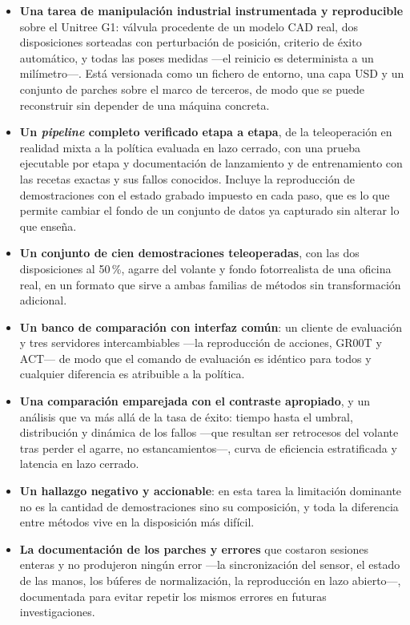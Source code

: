 \begin{itemize}

	\item \textbf{Una tarea de manipulación industrial instrumentada y reproducible} sobre el
	Unitree G1: válvula procedente de un modelo CAD real, dos disposiciones sorteadas con
	perturbación de posición, criterio de éxito automático, y todas las poses medidas —el reinicio
	es determinista a un milímetro—. Está versionada como un fichero de entorno, una capa USD y
	un conjunto de parches sobre el marco de terceros, de modo que se puede reconstruir sin
	depender de una máquina concreta.

	\item \textbf{Un \textit{pipeline} completo verificado etapa a etapa}, de la
	teleoperación en realidad mixta a la política evaluada en lazo cerrado, con una prueba
	ejecutable por etapa y documentación de lanzamiento y de entrenamiento con las recetas
	exactas y sus fallos conocidos. Incluye la reproducción de demostraciones con el estado grabado
	impuesto en cada paso, que es lo que permite cambiar el fondo de un conjunto de datos ya
	capturado sin alterar lo que enseña.

	\item \textbf{Un conjunto de cien demostraciones teleoperadas}, con las dos disposiciones al
	50\,\%, agarre del volante y fondo fotorrealista de una oficina real, en un formato que sirve a
	ambas familias de métodos sin transformación adicional.

	\item \textbf{Un banco de comparación con interfaz común}: un cliente de evaluación y tres
	servidores intercambiables —la reproducción de acciones, GR00T y ACT— de modo que el comando de
	evaluación es idéntico para todos y cualquier diferencia es atribuible a la política.

	\item \textbf{Una comparación emparejada con el contraste apropiado}, y un análisis que va más
	allá de la tasa de éxito: tiempo hasta el umbral, distribución y dinámica de los fallos —que
	resultan ser retrocesos del volante tras perder el agarre, no estancamientos—, curva de
	eficiencia estratificada y latencia en lazo cerrado.

	\item \textbf{Un hallazgo negativo y accionable}: en esta tarea la limitación dominante no es
	la cantidad de demostraciones sino su composición, y toda la diferencia entre métodos vive en
	la disposición más difícil.

	\item \textbf{La documentación de los parches y errores} que costaron sesiones enteras y no produjeron
	ningún error —la sincronización del sensor, el estado de las manos, los búferes de
	normalización, la reproducción en lazo abierto—, documentada para evitar repetir los mismos errores en futuras investigaciones.

\end{itemize}


